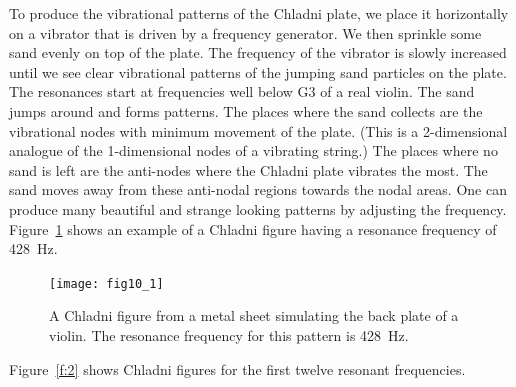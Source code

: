 \documentclass[11pt]{NSF}
\begin{document}
To produce the vibrational patterns of the Chladni plate, we place 
it horizontally on a vibrator that is driven by a frequency generator.
We then sprinkle some sand evenly on top of the plate.
The frequency of the vibrator is slowly increased until we see clear 
vibrational patterns of the jumping sand particles on the plate. 
The resonances start at frequencies well below G3 of a real violin. 
The sand jumps around and forms patterns. The places where the
sand collects are the vibrational nodes with minimum movement of the
plate. (This is a 2-dimensional analogue of the 1-dimensional nodes of
a vibrating string.) The places where no sand is left are the
anti-nodes where the Chladni plate vibrates the most. The sand moves
away from these anti-nodal regions towards the nodal areas. 
One can produce many beautiful and strange looking patterns by
adjusting the frequency. 
Figure~\ref{f:1} shows an example of a Chladni figure having a
resonance frequency of 428~Hz.
%
\begin{figure}[hbtp]
\begin{center}
\texttt{[image: fig10\_1]}
\caption{
A Chladni figure from a metal sheet simulating the back plate of a
violin.
The resonance frequency for this pattern is 428~Hz.}
\label{f:1}
\end{center}
\end{figure}
%
Figure~\ref{f:2} shows Chladni figures for the first twelve 
resonant frequencies.
%
\end{document}
